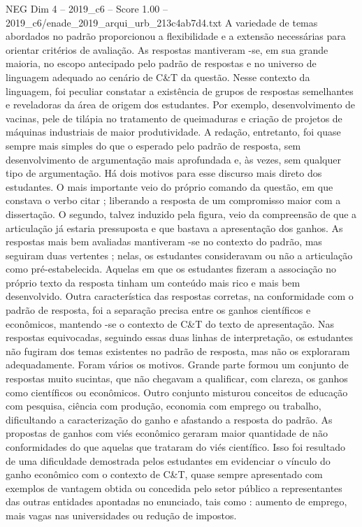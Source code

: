 \begin{textsample}{NEG Dim 4 – 2019\_c6 – Score 1.00 – 2019\_c6/enade\_2019\_arqui\_urb\_213c4ab7d4.txt}
A variedade de temas abordados no padrão proporcionou a flexibilidade e a extensão necessárias para orientar critérios de avaliação.
As respostas mantiveram -se, em sua grande maioria, no escopo antecipado pelo padrão de respostas e no universo de linguagem adequado ao cenário de C\&T da questão.
Nesse contexto da linguagem, foi peculiar constatar a existência de grupos de respostas semelhantes e reveladoras da área de origem dos estudantes.
Por exemplo, desenvolvimento de vacinas, pele de tilápia no tratamento de queimaduras e criação de projetos de máquinas industriais de maior produtividade.
A redação, entretanto, foi quase sempre mais simples do que o esperado pelo padrão de resposta, sem desenvolvimento de argumentação mais aprofundada e, às vezes, sem qualquer tipo de argumentação.
Há dois motivos para esse discurso mais direto dos estudantes.
O mais importante veio do próprio comando da questão, em que constava o verbo citar ; liberando a resposta de um compromisso maior com a dissertação.
O segundo, talvez induzido pela figura, veio da compreensão de que a articulação já estaria pressuposta e que bastava a apresentação dos ganhos.
As respostas mais bem avaliadas mantiveram -se no contexto do padrão, mas seguiram duas vertentes ; nelas, os estudantes consideravam ou não a articulação como pré-estabelecida.
Aquelas em que os estudantes fizeram a associação no próprio texto da resposta tinham um conteúdo mais rico e mais bem desenvolvido.
Outra característica das respostas corretas, na conformidade com o padrão de resposta, foi a separação precisa entre os ganhos científicos e econômicos, mantendo -se o contexto de C\&T do texto de apresentação.
Nas respostas equivocadas, seguindo essas duas linhas de interpretação, os estudantes não fugiram dos temas existentes no padrão de resposta, mas não os exploraram adequadamente.
Foram vários os motivos.
Grande parte formou um conjunto de respostas muito sucintas, que não chegavam a qualificar, com clareza, os ganhos como científicos ou econômicos.
Outro conjunto misturou conceitos de educação com pesquisa, ciência com produção, economia com emprego ou trabalho, dificultando a caracterização do ganho e afastando a resposta do padrão.
As propostas de ganhos com viés econômico geraram maior quantidade de não conformidades do que aquelas que trataram do viés científico.
Isso foi resultado de uma dificuldade demostrada pelos estudantes em evidenciar o vínculo do ganho econômico com o contexto de C\&T, quase sempre apresentado com exemplos de vantagem obtida ou concedida pelo setor público a representantes das outras entidades apontadas no enunciado, tais como : aumento de emprego, mais vagas nas universidades ou redução de impostos.

\end{textsample}
